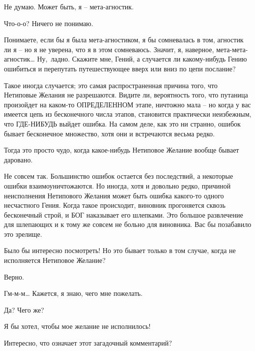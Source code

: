 \documentclass[../main.tex]{subfiles}
\begin{document}
\begin{Dialogue}
\begin{sublevel}
\begin{sublevel}
 Не думаю. Может быть, я \--- мета-агностик.

 Что-о-о? Ничего не понимаю.

 Понимаете, если бы я была мета-агностиком, я бы сомневалась в том, агностик ли я \--- но я не уверена, что я в этом сомневаюсь. Значит, я, наверное, мета-мета-агностик\ldots{} Ну,~ладно. Скажите мне, Гений, а случается ли какому-нибудь Гению ошибиться и перепутать путешествующее вверх или вниз по цепи послание?

 Такое иногда случается; это самая распространенная причина того, что Нетиповые Желания не разрешаются. Видите ли, вероятность того, что путаница произойдет на каком-то ОПРЕДЕЛЕННОМ этапе, ничтожно мала \--- но когда у вас имеется цепь из бесконечного числа этапов, становится практически неизбежным, что ГДЕ-НИБУДЬ выйдет ошибка. На самом деле, как это ни странно, ошибок бывает бесконечное множество, хотя они и встречаются весьма редко.

 Тогда это просто чудо, когда какое-нибудь Нетиповое Желание вообще бывает даровано.

 Не совсем так. Большинство ошибок остается без последствий, а некоторые ошибки взаимоуничтожаются. Но иногда, хотя и довольно редко, причиной неисполнения Нетипового Желания может быть ошибка какого-то одного несчастного Гения. Когда такое происходит, виновник прогоняется сквозь бесконечный строй, и БОГ наказывает его шлепками. Это большое развлечение для шлепающих и к тому же совсем не больно для виновника. Вас бы позабавило это зрелище.

 Было бы интересно посмотреть! Но это бывает только в том случае, когда не исполняется Нетиповое Желание?

 Верно.

 Гм-м-м\ldots{} Кажется, я знаю, чего мне пожелать.

 Да? Чего же?

 Я бы хотел, чтобы мое желание не исполнилось!



\begin{customlevel}{0}

 Интересно, что означает этот загадочный комментарий?


\end{customlevel}
\end{sublevel}
\end{sublevel}
\end{Dialogue}
\end{document}

